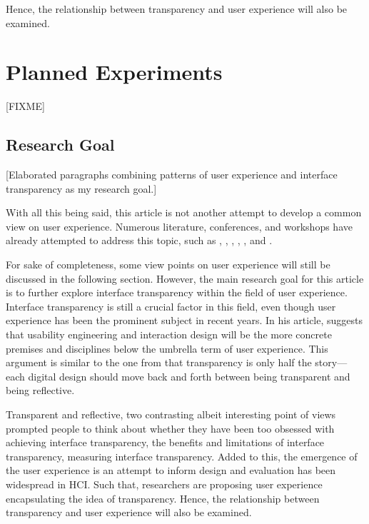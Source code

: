 \documentclass{acm_proc_article-sp}
\begin{document}
Hence, the relationship between transparency and user
experience will also be examined.


\section{Planned Experiments}
\label{sec:experiment}
[FIXME]

\subsection{Research Goal}
[Elaborated paragraphs combining patterns of user experience and
  interface transparency as my research goal.]

With all this being said, this article is not another attempt to
develop a common view on user experience. Numerous literature,
conferences, and workshops have already attempted to address this
topic, such as \citet{early:forlizzi}, \citet{emotional:norman},
\citet{action:dourish}, \citet{ux:hassenzahl},
\citet{experience:desmet}, and \citet{ux:law}.

For sake of completeness, some view points on user experience will
still be discussed in the following section. However, the main
research goal for this article is to further explore interface
transparency within the field of user experience. Interface
transparency is still a crucial factor in this field, even though user
experience has been the prominent subject in recent years. In his
article, \citet{future:memmel} suggests that usability engineering and
interaction design will be the more concrete premises and disciplines
below the umbrella term of user experience. This argument is similar
to the one from \citet{windows:bolter} that transparency is only half
the story---each digital design should move back and forth between
being transparent and being reflective.

Transparent and reflective, two contrasting albeit interesting point
of views prompted people to think about whether they have been too
obsessed with achieving interface transparency, the benefits and
limitations of interface transparency, measuring interface
transparency. Added to this, the emergence of the user experience is
an attempt to inform design and evaluation has been widespread in
HCI. Such that, researchers are proposing user experience
encapsulating the idea of transparency. Hence, the relationship
between transparency and user experience will also be examined.

\end{document}
